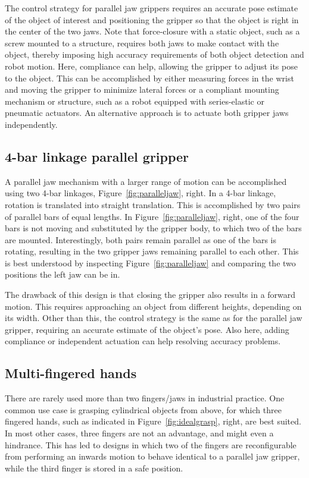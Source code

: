 The control strategy for parallel jaw grippers requires an accurate pose estimate of the object of interest and positioning the gripper so that the object is right in the center of the two jaws. Note that force-closure with a static object, such as a screw mounted to a structure, requires both jaws to make contact with the object, thereby imposing high accuracy requirements of both object detection and robot motion. Here, compliance can help, allowing the gripper to adjust its pose to the object. This can be accomplished by either measuring forces in the wrist and moving the gripper to minimize lateral forces or a compliant mounting mechanism or structure, such as a robot equipped with series-elastic or pneumatic actuators. An alternative approach is to actuate both gripper jaws independently.


\subsection{4-bar linkage parallel gripper}
A parallel jaw mechanism with a larger range of motion can be accomplished using two 4-bar linkages, Figure~\ref{fig:paralleljaw}, right. In a 4-bar linkage, rotation is translated into  straight translation. This is accomplished by two pairs of parallel bars of equal lengths. In Figure~\ref{fig:paralleljaw}, right, one of the four bars is not moving and substituted by the gripper body, to which two of the bars are mounted. Interestingly, both pairs remain parallel as one of the bars is rotating, resulting in the two gripper jaws remaining parallel to each other. This is best understood by inspecting Figure~\ref{fig:paralleljaw} and comparing the two positions the left jaw can be in. 


The drawback of this design is that closing the gripper also results in a forward motion. This requires approaching an object from different heights, depending on its width. Other than this, the control strategy is the same as for the parallel jaw gripper, requiring an accurate estimate of the object's pose. Also here, adding compliance or independent actuation can help resolving accuracy problems. 

\subsection{Multi-fingered hands}
There are rarely used more than two fingers/jaws in industrial practice. One common use case is grasping cylindrical objects from above, for which three fingered hands, such as indicated in Figure~\ref{fig:idealgrasp}, right, are best suited. In most other cases, three fingers are not an advantage, and might even a hindrance. This has led to designs in which two of the fingers are reconfigurable from performing an inwards motion to behave identical to a parallel jaw gripper, while the third finger is stored in a safe position. 

